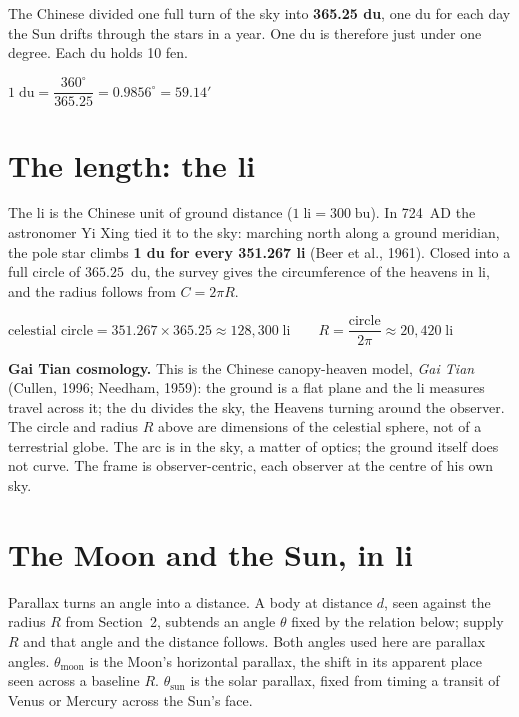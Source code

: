 \documentclass[11pt]{article}
\begin{document}
The Chinese divided one full turn of the sky into \textbf{365.25 du}, one du
for each day the Sun drifts through the stars in a year. One du is therefore
just under one degree. Each du holds 10 fen.

\begin{tcolorbox}[mathbox]
$1\;\text{du} = \dfrac{360^\circ}{365.25} = 0.9856^\circ = 59.14'$
\end{tcolorbox}

\section{The length: the li}

The li is the Chinese unit of ground distance ($1\;\text{li} = 300\;\text{bu}$).
In 724~AD the astronomer Yi Xing tied it to the sky: marching north along a
ground meridian, the pole star climbs \textbf{1 du for every 351.267 li} (Beer et al., 1961).
Closed into a full circle of $365.25$~du, the survey gives the circumference
of the heavens in li, and the radius follows from $C = 2\pi R$.

\begin{tcolorbox}[mathbox]
$\text{celestial circle} = 351.267 \times 365.25 \approx 128{,}300\;\text{li}
\qquad
R = \dfrac{\text{circle}}{2\pi} \approx 20{,}420\;\text{li}$
\end{tcolorbox}

\begin{tcolorbox}[quotebox]
\textbf{Gai Tian cosmology.} This is the Chinese canopy-heaven model,
\emph{Gai Tian} (Cullen, 1996; Needham, 1959): the ground is a flat plane and
the li measures travel across
it; the du divides the sky, the Heavens turning around the observer. The circle
and radius $R$ above are dimensions of the celestial sphere, not of a
terrestrial globe. The arc is in the sky, a matter of optics; the ground
itself does not curve. The frame is observer-centric, each observer at the
centre of his own sky.
\end{tcolorbox}

\section{The Moon and the Sun, in li}

Parallax turns an angle into a distance. A body at distance $d$, seen against
the radius $R$ from Section~2, subtends an angle $\theta$ fixed by the
relation below; supply $R$ and that angle and the distance follows. Both
angles used here are parallax angles. $\theta_{\text{moon}}$ is the Moon's
horizontal parallax, the shift in its apparent place seen across a baseline
$R$. $\theta_{\text{sun}}$ is the solar parallax, fixed from timing a transit
of Venus or Mercury across the Sun's face.
\end{document}
